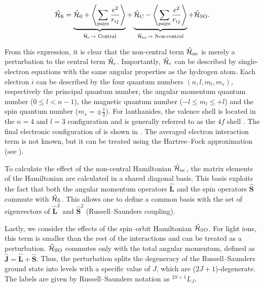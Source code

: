 \begin{align}
\begin{split}
    \hat{\mathcal{H}}_{\text{fi}} = \underbrace{\hat{\mathcal{H}}_{\text{0}} + \left\langle\sum_{\text{pairs}} \frac{e^2}{r_{ij}}\right\rangle}_{\hat{\mathcal{H}}_{\text{c}} \rightarrow \text{ Central}} + \underbrace{\hat{\mathcal{H}}_{\text{C}} - \left\langle\sum_{\text{pairs}} \frac{e^2}{r_{ij}}\right\rangle}_{\hat{\mathcal{H}}_{\text{nc}} \rightarrow \text{ Non-central}} + \hat{\mathcal{H}}_{\text{SO}}.
\end{split}
\end{align}

From this expression, it is clear that the non-central term $\hat{\mathcal{H}}_{\text{nc}}$ is merely a perturbation to the central term $\hat{\mathcal{H}}_{\text{c}}$. Importantly, $\hat{\mathcal{H}}_{\text{c}}$ can be described by single-electron equations with the same angular properties as the hydrogen atom. Each electron $i$ can be described by the four quantum numbers $(n, l, m_l, m_s)$, respectively the principal quantum number, the angular momentum quantum number ($0\leq l<n-1$), the magnetic quantum number ($-l\leq m_l\leq +l$) and the spin quantum number ($m_s=\pm\tfrac{1}{2}$). For lanthanides, the valence shell is located in the $n=4$ and $l=3$ configuration and is generally referred to as the $4f$ shell . The final electronic configuration of \Er is shown in . The averaged electron interaction term is not known, but it can be treated using the Hartree--Fock approximation (see ).

To calculate the effect of the non-central Hamiltonian $\hat{\mathcal{H}}_{\text{nc}}$, the matrix elements of the Hamiltonian are calculated in a shared diagonal basis. This basis exploits the fact that both the angular momentum operators $\hat{\mathbf{L}}$ and the spin operators $\hat{\mathbf{S}}$ commute with $\hat{\mathcal{H}}_{\text{fi}}$. This allows one to define a common basis with the set of eigenvectors of $\hat{\mathbf{L}}^2$ and $\hat{\mathbf{S}}^2$ (Russell--Saunders coupling).

Lastly, we consider the effects of the spin--orbit Hamiltonian $\hat{\mathcal{H}}_{\text{SO}}$. For light ions, this term is smaller than the rest of the interactions and can be treated as a perturbation. $\hat{\mathcal{H}}_{\text{SO}}$ commutes only with the total angular momentum, defined as $\hat{\mathbf{J}} = \hat{\mathbf{L}} + \hat{\mathbf{S}}$. Thus, the perturbation splits the degeneracy of the Russell--Saunders ground state into levels with a specific value of $J$, which are ($2J+1$)-degenerate. The labels are given by Russell--Saunders notation as $^{2S+1}L_J$.%

